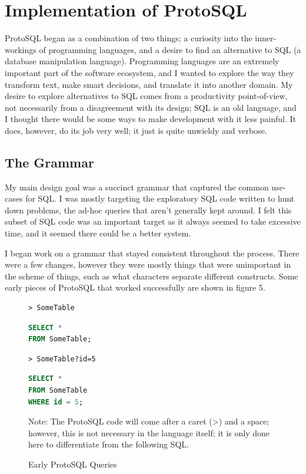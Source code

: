 \documentclass[titlepage]{article}
\begin{document}
	\section{Implementation of ProtoSQL}

		ProtoSQL began as a combination of two things; a curiosity into the inner-workings of programming languages, and a desire to find an alternative to SQL (a database manipulation language).  Programming languages are an extremely important part of the software ecosystem, and I wanted to explore the way they transform text, make smart decisions, and translate it into another domain.  My desire to explore alternatives to SQL comes from a productivity point-of-view, not necessarily from a disagreement with its design; SQL is an old language, and I thought there would be some ways to make development with it less painful.  It does, however, do its job very well; it just is quite unwieldy and verbose.

		\subsection{The Grammar}

			My main design goal was a succinct grammar that captured the common use-cases for SQL.  I was mostly targeting the exploratory SQL code written to hunt down problems, the ad-hoc queries that aren't generally kept around.  I felt this subset of SQL code was an important target as it always seemed to take excessive time, and it seemed there could be a better system.

			I began work on a grammar that stayed consistent throughout the process.  There were a few changes, however they were mostly things that were unimportant in the scheme of things, such as what characters separate different constructs.  Some early pieces of ProtoSQL that worked successfully are shown in figure 5.
			\newline

\begin{figure}
	\caption{Early ProtoSQL Queries}
	\begin{lstlisting}[language=ProtoSQL]
> SomeTable
	\end{lstlisting}

	\begin{lstlisting}[language=SQL]
SELECT *
FROM SomeTable;
	\end{lstlisting}

	\begin{lstlisting}[language=ProtoSQL]
> SomeTable?id=5
	\end{lstlisting}

	\begin{lstlisting}[language=SQL]
SELECT *
FROM SomeTable
WHERE id = 5;
	\end{lstlisting}

	Note: The ProtoSQL code will come after a caret (\textgreater) and a space; however, this is not necessary in the language itself; it is only done here to differentiate from the following SQL.
\end{figure}
\end{document}
